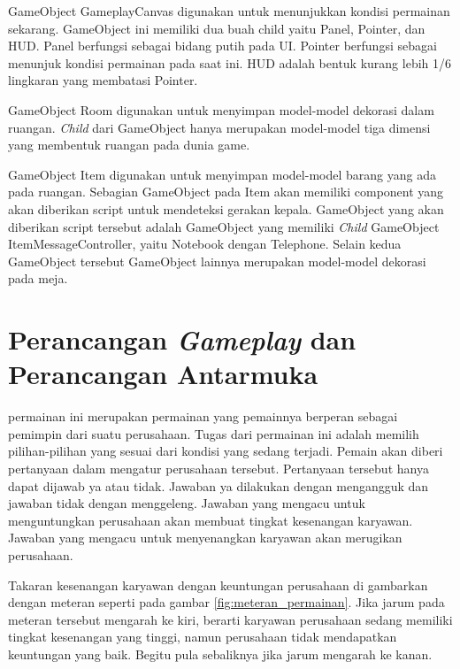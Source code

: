 GameObject GameplayCanvas digunakan untuk menunjukkan kondisi permainan sekarang. GameObject ini memiliki dua buah child yaitu Panel, Pointer, dan HUD. Panel berfungsi sebagai bidang putih pada UI. Pointer berfungsi sebagai menunjuk kondisi permainan pada saat ini. HUD adalah bentuk kurang lebih 1/6 lingkaran yang membatasi Pointer. 

GameObject Room digunakan untuk menyimpan model-model dekorasi dalam ruangan. \textit{Child} dari GameObject hanya merupakan model-model tiga dimensi yang membentuk ruangan pada dunia game.

GameObject Item digunakan untuk menyimpan model-model barang yang ada pada ruangan. Sebagian GameObject pada Item akan memiliki component yang akan diberikan script untuk mendeteksi gerakan kepala. GameObject yang akan diberikan script tersebut adalah GameObject yang memiliki \textit{Child} GameObject ItemMessageController, yaitu Notebook dengan Telephone. Selain kedua GameObject tersebut GameObject lainnya merupakan model-model dekorasi pada meja.

\section{Perancangan \textit{Gameplay} dan Perancangan Antarmuka}
\label{sec:perancangan_gameplay}

permainan ini merupakan permainan yang pemainnya berperan sebagai pemimpin dari suatu perusahaan. Tugas dari permainan ini adalah memilih pilihan-pilihan yang sesuai dari kondisi yang sedang terjadi. Pemain akan diberi pertanyaan dalam mengatur perusahaan tersebut. Pertanyaan tersebut hanya dapat dijawab ya atau tidak. Jawaban ya dilakukan dengan mengangguk dan jawaban tidak dengan menggeleng. Jawaban yang mengacu untuk menguntungkan perusahaan akan membuat tingkat kesenangan karyawan. Jawaban yang mengacu untuk menyenangkan karyawan akan merugikan perusahaan.

Takaran kesenangan karyawan dengan keuntungan perusahaan di gambarkan dengan meteran seperti pada gambar \ref{fig:meteran_permainan}. Jika jarum pada meteran tersebut mengarah ke kiri, berarti karyawan perusahaan sedang memiliki tingkat kesenangan yang tinggi, namun perusahaan tidak mendapatkan keuntungan yang baik. Begitu pula sebaliknya jika jarum mengarah ke kanan. 

